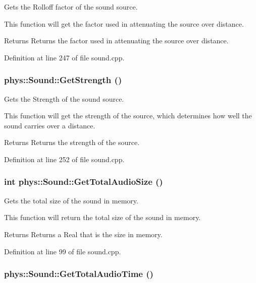 Gets the Rolloff factor of the sound source. 

This function will get the factor used in attenuating the source over distance. \begin{DoxyReturn}{Returns}
Returns the factor used in attenuating the source over distance. 
\end{DoxyReturn}


Definition at line 247 of file sound.cpp.

\hypertarget{classphys_1_1Sound_ab839e69523500591b40252e32bafbbb3}{
\subsubsection[{GetStrength}]{ phys::Sound::GetStrength ()}}
\label{dc/d2f/classphys_1_1Sound_ab839e69523500591b40252e32bafbbb3}


Gets the Strength of the sound source. 

This function will get the strength of the source, which determines how well the sound carries over a distance. \begin{DoxyReturn}{Returns}
Returns the strength of the source. 
\end{DoxyReturn}


Definition at line 252 of file sound.cpp.

\hypertarget{classphys_1_1Sound_a2891732590e4276a64583ee9bdab555e}{
\subsubsection[{GetTotalAudioSize}]{\setlength{\rightskip}{0pt plus 5cm}int phys::Sound::GetTotalAudioSize ()}}
\label{dc/d2f/classphys_1_1Sound_a2891732590e4276a64583ee9bdab555e}


Gets the total size of the sound in memory. 

This function will return the total size of the sound in memory. \begin{DoxyReturn}{Returns}
Returns a Real that is the size in memory. 
\end{DoxyReturn}


Definition at line 99 of file sound.cpp.

\hypertarget{classphys_1_1Sound_a2c3864cbc6c25cd9a47529c75dea142b}{
\subsubsection[{GetTotalAudioTime}]{ phys::Sound::GetTotalAudioTime ()}}
\label{dc/d2f/classphys_1_1Sound_a2c3864cbc6c25cd9a47529c75dea142b}


